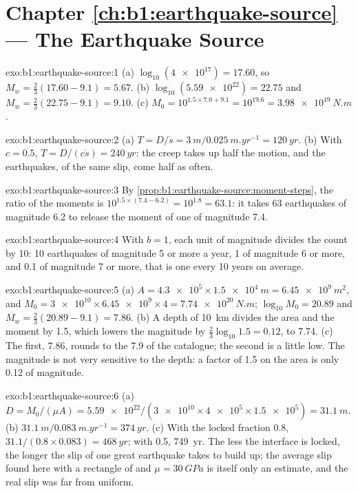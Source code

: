 \section*{Chapter \ref{ch:b1:earthquake-source} --- The Earthquake Source}

\begin{solution}{exo:b1:earthquake-source:1}
(a) $\log_{10}(\num{4e17}) = 17.60$, so $M_w = \tfrac23(17.60 - 9.1) = 5.67$.
(b) $\log_{10}(\num{5.59e22}) = 22.75$ and $M_w = \tfrac23(22.75 - 9.1) =
9.10$. (c) $M_0 = 10^{1.5\times7.0 + 9.1} = 10^{19.6} = \qty{3.98e19}{N.m}$.
\end{solution}

\begin{solution}{exo:b1:earthquake-source:2}
(a) $T = D/\dot s = \qty{3}{m}/\qty{0.025}{m.yr^{-1}} = \qty{120}{yr}$.
(b) With $c = 0.5$, $T = D/(c\dot s) = \qty{240}{yr}$: the creep takes up half
the motion, and the earthquakes, of the same slip, come half as often.
\end{solution}

\begin{solution}{exo:b1:earthquake-source:3}
By \cref{prop:b1:earthquake-source:moment-steps}, the ratio of the moments is
$10^{1.5\times(7.4 - 6.2)} = 10^{1.8} = 63.1$: it takes 63 earthquakes of
magnitude 6.2 to release the moment of one of magnitude 7.4.
\end{solution}

\begin{solution}{exo:b1:earthquake-source:4}
With $b = 1$, each unit of magnitude divides the count by 10: 10 earthquakes of
magnitude 5 or more a year, 1 of magnitude 6 or more, and 0.1 of magnitude 7 or
more, that is one every 10 years on average.
\end{solution}

\begin{solution}{exo:b1:earthquake-source:5}
(a) $A = \num{4.3e5} \times \qty{1.5e4}{m} = \qty{6.45e9}{m^2}$, and
$M_0 = \num{3e10}\times\num{6.45e9}\times4 = \qty{7.74e20}{N.m}$;
$\log_{10}M_0 = 20.89$ and $M_w = \tfrac23(20.89 - 9.1) = 7.86$. (b) A depth of
\qty{10}{km} divides the area and the moment by 1.5, which lowers the magnitude
by $\tfrac23\log_{10}1.5 = 0.12$, to 7.74. (c) The first, 7.86, rounds to the
7.9 of the catalogue; the second is a little low. The magnitude is not very
sensitive to the depth: a factor of 1.5 on the area is only 0.12 of magnitude.
\end{solution}

\begin{solution}{exo:b1:earthquake-source:6}
(a) $D = M_0/(\mu A) = \num{5.59e22}/(\num{3e10}\times\num{4e5}\times\num{1.5e5})
= \qty{31.1}{m}$. (b) $\qty{31.1}{m}/\qty{0.083}{m.yr^{-1}} = \qty{374}{yr}$.
(c) With the locked fraction 0.8, $31.1/(0.8\times0.083) = \qty{468}{yr}$; with
0.5, \qty{749}{yr}. The less the interface is locked, the longer the slip of
one great earthquake takes to build up; the average slip found here with a
rectangle of  and $\mu = \qty{30}{GPa}$ is itself
only an estimate, and the real slip was far from uniform.
\end{solution}

